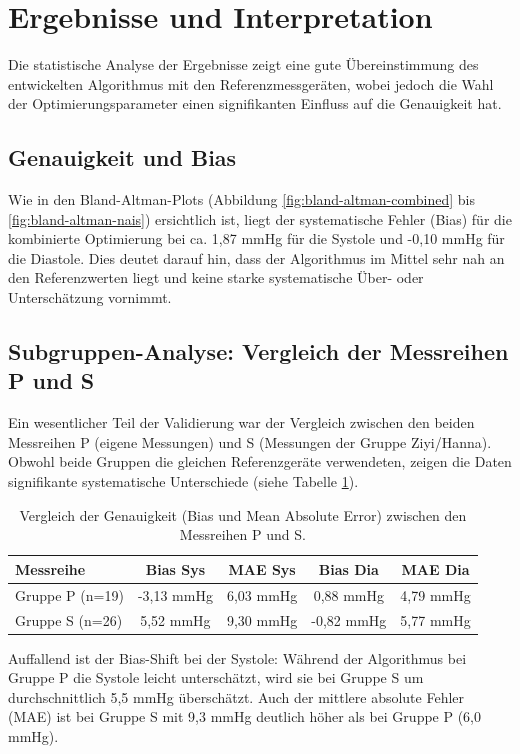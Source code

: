 \documentclass[a4paper, 11pt]{scrartcl}
\newcommand{\q}[1]{\glqq#1\grqq{}} %
\begin{document}
\newpage
\section{Ergebnisse und Interpretation}

Die statistische Analyse der Ergebnisse zeigt eine gute Übereinstimmung des entwickelten Algorithmus mit den Referenzmessgeräten, wobei jedoch die Wahl der Optimierungsparameter einen signifikanten Einfluss auf die Genauigkeit hat.
\subsection{Genauigkeit und Bias}
Wie in den Bland-Altman-Plots (Abbildung \ref{fig:bland-altman-combined} bis \ref{fig:bland-altman-nais}) ersichtlich ist, liegt der systematische Fehler (Bias) für die kombinierte Optimierung bei ca. 1,87 mmHg für die Systole und -0,10 mmHg für die Diastole. Dies deutet darauf hin, dass der Algorithmus im Mittel sehr nah an den Referenzwerten liegt und keine starke systematische Über- oder Unterschätzung vornimmt.

\subsection{Subgruppen-Analyse: Vergleich der Messreihen P und S}
Ein wesentlicher Teil der Validierung war der Vergleich zwischen den beiden Messreihen P (eigene Messungen) und S (Messungen der Gruppe Ziyi/Hanna). Obwohl beide Gruppen die gleichen Referenzgeräte verwendeten, zeigen die Daten signifikante systematische Unterschiede (siehe Tabelle \ref{tab:subgruppen}).

\begin{table}[H]
\centering
\begin{tabular}{|l|c|c|c|c|}
\hline
\textbf{Messreihe} & \textbf{Bias Sys} & \textbf{MAE Sys} & \textbf{Bias Dia} & \textbf{MAE Dia} \\ \hline
Gruppe P (n=19) & -3,13 mmHg & 6,03 mmHg & 0,88 mmHg & 4,79 mmHg \\ \hline
Gruppe S (n=26) & 5,52 mmHg & 9,30 mmHg & -0,82 mmHg & 5,77 mmHg \\ \hline
\end{tabular}
\caption{Vergleich der Genauigkeit (Bias und Mean Absolute Error) zwischen den Messreihen P und S.}
\label{tab:subgruppen}
\end{table}

Auffallend ist der \q{Bias-Shift} bei der Systole: Während der Algorithmus bei Gruppe P die Systole leicht unterschätzt, wird sie bei Gruppe S um durchschnittlich 5,5 mmHg überschätzt. Auch der mittlere absolute Fehler (MAE) ist bei Gruppe S mit 9,3 mmHg deutlich höher als bei Gruppe P (6,0 mmHg).
\end{document}
